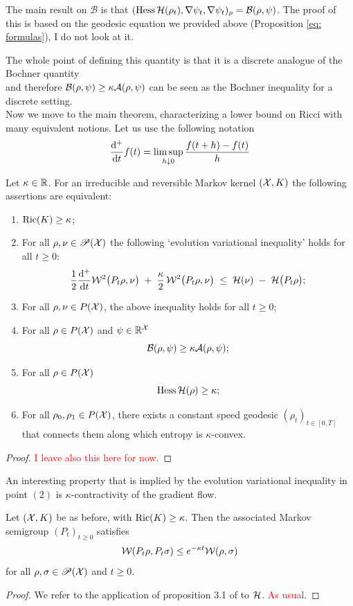 The main result on $\mathcal{B}$ is that $(\mathop{\mathrm{Hess}}\nolimits\mathcal{H}(\rho_t),\nabla \psi_t,\nabla\psi_t)_\rho =\mathcal{B}(\rho,\psi) $. The proof of this is based on the geodesic equation we provided above (Proposition \ref{eq: formulas}), I do not look at it. 

The whole point of defining this quantity is that it is a discrete analogue of the Bochner quantity\[
\]
and therefore $\mathcal{B}(\rho,\psi)\ge \kappa \mathcal{A}(\rho,\psi)$ can be seen as the Bochner inequality for a discrete setting. 
\\

Now we move to the main theorem, characterizing a lower bound on Ricci with many equivalent notions. Let us use the following notation
\[
\frac{\mathop{}\!\mathrm{d}^+}{\mathop{}\!\mathrm{d} t}f(t)=\limsup_{h\downarrow0}\frac{f(t+h)-f(t)}{h}
\]

\begin{theorem}
    Let $\kappa \in \mathbb{R}$. For an irreducible and reversible Markov kernel $(\mathcal{X},K)$ the following assertions are equivalent:
    \begin{enumerate}
        \item $\mathop{\mathrm{Ric}}\nolimits(K)\ge \kappa$;
        \item For all $\rho,\nu \in \mathscr{P}(\mathcal{X})$ the following `evolution variational inequality' holds for all $t\ge0$:
        \[
\frac{1}{2}\frac{\mathop{}\!\mathrm{d} ^+}{\mathop{}\!\mathrm{d} t}\mathcal{W}^2\bigl(P_t\rho,\nu\bigr)
\;+\;\frac{\kappa}{2}\,\mathcal{W}^2\bigl(P_t\rho,\nu\bigr)
\;\le\;
\mathcal{H}(\nu)\;-\;\mathcal{H}\bigl(P_t\rho\bigr);
\]
        \item For all $\rho,\nu \in P(\mathcal{X})$, the above inequality holds for all $t\ge0$;
        \item For all $\rho \in P(\mathcal{X})$ and $\psi \in \mathbb{R}^{\mathcal{X}}$
        \[
        \mathcal{B}(\rho,\psi) \ge \kappa \mathcal{A}(\rho,\psi);
        \]
        \item For all $\rho \in P(\mathcal{X})$\[\mathop{\mathrm{Hess}}\nolimits\mathcal{H}(\rho)\ge \kappa;\]
        \item For all $\rho_0,\rho_1 \in P(\mathcal{X})$, there exists a constant speed geodesic $(\rho_t)_{t\in[0,T]}$ that connects them along which entropy is $\kappa$-convex. 
    \end{enumerate}

    \begin{proof}
        \textcolor{red}{I leave also this here for now.} 
    \end{proof}
\end{theorem}


An interesting property that is implied by the evolution variational inequality in point $(2)$ is $\kappa$-contractivity of the gradient flow. 
\begin{proposition}
    Let $(\mathcal{X},K)$ be as before, with $\mathop{\mathrm{Ric}}\nolimits(K)\ge\kappa$. Then the associated Markov semigroup $(P_t)_{t\ge0}$ satisfies \[
\mathcal{W}(P_t\rho,P_t\sigma) \le e^{-\kappa t}\mathcal{W}(\rho,\sigma)
\]
for all $\rho,\sigma \in \mathscr{P}(\mathcal{X})$ and $t\ge 0$. 
\begin{proof}
    We refer to the application of proposition 3.1 of \cite{savaré} to $\mathcal{H}$. \textcolor{red}{As usual}.
\end{proof}
\end{proposition}

